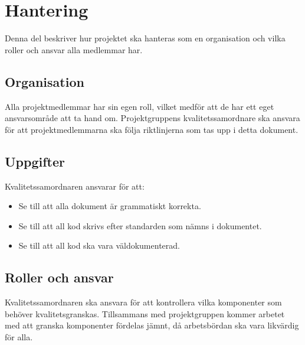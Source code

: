 \section{Hantering}
Denna del beskriver hur projektet ska hanteras som en organisation och vilka roller och ansvar alla medlemmar har. 

\subsection{Organisation}
Alla projektmedlemmar har sin egen roll, vilket medför att de har ett eget ansvarsområde att ta hand om. Projektgruppens kvalitetssamordnare ska ansvara för att projektmedlemmarna ska följa riktlinjerna som tas upp i detta dokument.

\subsection{Uppgifter}
Kvalitetssamordnaren ansvarar för att:
\begin{itemize}
\item Se till att alla dokument är grammatiskt korrekta. 
\item Se till att all kod skrivs efter standarden som nämns i dokumentet.
\item Se till att all kod ska vara väldokumenterad.
\end{itemize}

\subsection{Roller och ansvar}
Kvalitetssamordnaren ska ansvara för att kontrollera vilka komponenter som behöver kvalitetsgranskas. Tillsammans med projektgruppen kommer arbetet med att granska komponenter fördelas jämnt, då arbetsbördan ska vara likvärdig för alla.




